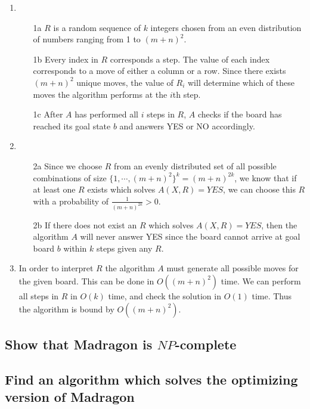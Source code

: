 \documentclass[12pt]{article}
\begin{document}
\begin{enumerate}
    \item
        \begin{enumerate}
            \item[1a] $R$ is a random sequence of $k$ integers chosen from an even distribution of numbers ranging from 1 to $(m+n)^2$.
            \item[1b] Every index in $R$ corresponds a step. The value of each index corresponds to a move of either a column or a row. Since there exists $(m+n)^2$ unique moves, the value of $R_i$ will determine which of these moves the algorithm performs at the $i$th step.
            \item[1c] After $A$ has performed all $i$ steps in $R$, $A$ checks if the board has reached its goal state $b$ and answers YES or NO accordingly.
        \end{enumerate}
    \item
        \begin{enumerate}
            \item[2a] Since we choose $R$ from an evenly distributed set of all possible combinations of size $\{1, \cdots, (m+n)^2\}^k = (m+n)^{2k}$, we know that if at least one $R$ exists which solves $A(X, R) = YES$, we can choose this $R$ with a probability of $\frac{1}{(m+n)^{2k}} > 0$.
            \item[2b] If there does not exist an $R$ which solves $A(X, R) = YES$, then the algorithm $A$ will never answer YES since the board cannot arrive at goal board $b$ within $k$ steps given any $R$.
        \end{enumerate}
    \item
        In order to interpret $R$ the algorithm $A$ must generate all possible moves for the given board. This can be done in $O((m+n)^2)$ time. We can perform all steps in $R$ in $O(k)$ time, and check the solution in $O(1)$ time.
        Thus the algorithm is bound by $O((m+n)^2)$.
\end{enumerate}

\subsection{Show that Madragon is $NP$-complete}
\label{sub:Show that Madragon is $NP$-complete}

\subsection{Find an algorithm which solves the optimizing version of Madragon}
\label{sub:Find an algorithm which solves the optimizing version of Madragon}
\end{document}
